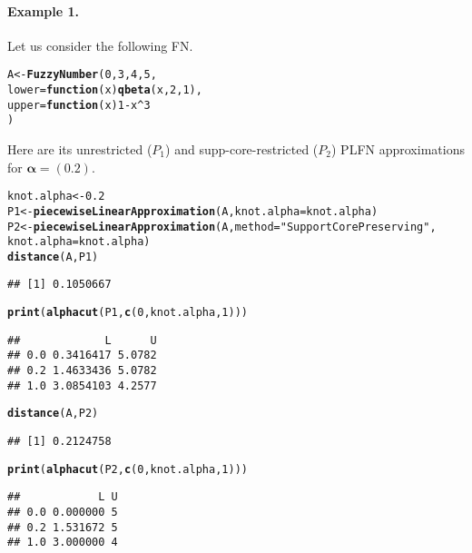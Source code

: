 \documentclass[11pt]{article}\usepackage[]{graphicx}\usepackage[]{color}
\makeatletter
\newcommand{\hlnum}[1]{\textcolor[rgb]{0.686,0.059,0.569}{#1}}%
\newcommand{\hlstr}[1]{\textcolor[rgb]{0.192,0.494,0.8}{#1}}%
\newcommand{\hlopt}[1]{\textcolor[rgb]{0,0,0}{#1}}%
\newcommand{\hlstd}[1]{\textcolor[rgb]{0.345,0.345,0.345}{#1}}%
\newcommand{\hlkwa}[1]{\textcolor[rgb]{0.161,0.373,0.58}{\textbf{#1}}}%
\newcommand{\hlkwb}[1]{\textcolor[rgb]{0.69,0.353,0.396}{#1}}%
\newcommand{\hlkwc}[1]{\textcolor[rgb]{0.333,0.667,0.333}{#1}}%
\newcommand{\hlkwd}[1]{\textcolor[rgb]{0.737,0.353,0.396}{\textbf{#1}}}%
\newenvironment{kframe}{%
 \def\at@end@of@kframe{}%
 \ifinner\ifhmode%
  \def\at@end@of@kframe{\end{minipage}}%
  \begin{minipage}{\columnwidth}%
 \fi\fi%
 \def\FrameCommand##1{\hskip\@totalleftmargin \hskip-\fboxsep
 \colorbox{shadecolor}{##1}\hskip-\fboxsep
     \hskip-\linewidth \hskip-\@totalleftmargin \hskip\columnwidth}%
 \MakeFramed {\advance\hsize-\width
   \@totalleftmargin\z@ \linewidth\hsize
   \@setminipage}}%
 {\par\unskip\endMakeFramed%
 \at@end@of@kframe}
\newenvironment{knitrout}{}{} %
\makeatother
\begin{document}
\paragraph{Example 1.}
Let us consider the following FN.

\begin{knitrout}\small
{}\color{fgcolor}\begin{kframe}
\begin{alltt}
\hlstd{A} \hlkwb{<-} \hlkwd{FuzzyNumber}\hlstd{(}\hlnum{0}\hlstd{,} \hlnum{3}\hlstd{,} \hlnum{4}\hlstd{,} \hlnum{5}\hlstd{,}
   \hlkwc{lower}\hlstd{=}\hlkwa{function}\hlstd{(}\hlkwc{x}\hlstd{)} \hlkwd{qbeta}\hlstd{(x,} \hlnum{2}\hlstd{,} \hlnum{1}\hlstd{),}
   \hlkwc{upper}\hlstd{=}\hlkwa{function}\hlstd{(}\hlkwc{x}\hlstd{)} \hlnum{1}\hlopt{-}\hlstd{x}\hlopt{^}\hlnum{3}
\hlstd{)}
\end{alltt}
\end{kframe}
\end{knitrout}

Here are its unrestricted ($P_1$) and supp-core-restricted ($P_2$)
PLFN approximations for $\boldsymbol\alpha=(0.2)$.

\begin{knitrout}\small
{}\color{fgcolor}\begin{kframe}
\begin{alltt}
\hlstd{knot.alpha} \hlkwb{<-} \hlnum{0.2}
\hlstd{P1} \hlkwb{<-} \hlkwd{piecewiseLinearApproximation}\hlstd{(A,} \hlkwc{knot.alpha}\hlstd{=knot.alpha)}
\hlstd{P2} \hlkwb{<-} \hlkwd{piecewiseLinearApproximation}\hlstd{(A,} \hlkwc{method}\hlstd{=}\hlstr{"SupportCorePreserving"}\hlstd{,}
   \hlkwc{knot.alpha}\hlstd{=knot.alpha)}
\hlkwd{distance}\hlstd{(A, P1)}
\end{alltt}
\begin{verbatim}
## [1] 0.1050667
\end{verbatim}
\begin{alltt}
\hlkwd{print}\hlstd{(}\hlkwd{alphacut}\hlstd{(P1,} \hlkwd{c}\hlstd{(}\hlnum{0}\hlstd{, knot.alpha,} \hlnum{1}\hlstd{)))}
\end{alltt}
\begin{verbatim}
##             L      U
## 0.0 0.3416417 5.0782
## 0.2 1.4633436 5.0782
## 1.0 3.0854103 4.2577
\end{verbatim}
\begin{alltt}
\hlkwd{distance}\hlstd{(A, P2)}
\end{alltt}
\begin{verbatim}
## [1] 0.2124758
\end{verbatim}
\begin{alltt}
\hlkwd{print}\hlstd{(}\hlkwd{alphacut}\hlstd{(P2,} \hlkwd{c}\hlstd{(}\hlnum{0}\hlstd{, knot.alpha,} \hlnum{1}\hlstd{)))}
\end{alltt}
\begin{verbatim}
##            L U
## 0.0 0.000000 5
## 0.2 1.531672 5
## 1.0 3.000000 4
\end{verbatim}
\end{kframe}
\end{knitrout}
\end{document}
